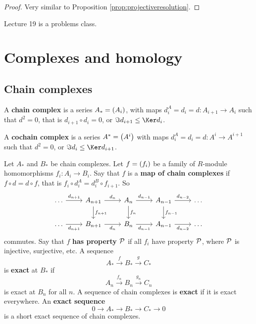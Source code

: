 \begin{proof}
Very similar to Proposition \ref{prop:projectiveresolution}.
\end{proof}


Lecture 19 is a problems class.

\pagebreak

\section{Complexes and homology}

\subsection{Chain complexes}


\begin{definition}
A \textbf{chain complex} is a series $ A_* = \br{A_i} $, with maps $ d_i^A = d_i = d : A_{i + 1} \to A_i $ such that $ d^2 = 0 $, that is $ d_{i + 1} \circ d_i = 0 $, or $ \Im d_{i + 1} \le \Ker d_i $.
\end{definition}

\begin{definition}
A \textbf{cochain complex} is a series $ A^* = \br{A^i} $ with maps $ d_i^A = d_i = d : A^i \to A^{i + 1} $ such that $ d^2 = 0 $, or $ \Im d_i \le \Ker d_{i + 1} $.
\end{definition}

Let $ A_* $ and $ B_* $ be chain complexes. Let $ f = \br{f_i} $ be a family of $ R $-module homomorphisms $ f_i : A_i \to B_i $. Say that $ f $ is a \textbf{map of chain complexes} if $ f \circ d = d \circ f $, that is $ f_i \circ d_i^A = d_i^B \circ f_{i + 1} $. So
$$
\begin{tikzcd}
\dots \arrow{r}{d_{n + 1}} & A_{n + 1} \arrow{r}{d_n} \arrow{d}{f_{n + 1}} & A_n \arrow{r}{d_{n - 1}} \arrow{d}{f_n} & A_{n - 1} \arrow{r}{d_{n - 2}} \arrow{d}{f_{n - 1}} & \dots \\
\dots \arrow[swap]{r}{d_{n + 1}} & B_{n + 1} \arrow[swap]{r}{d_n} & B_n \arrow[swap]{r}{d_{n - 1}} & A_{n - 1} \arrow[swap]{r}{d_{n - 2}} & \dots
\end{tikzcd}
$$
commutes. Say that $ f $ \textbf{has property $ \mathcal{P} $} if all $ f_i $ have property $ \mathcal{P} $, where $ \mathcal{P} $ is injective, surjective, etc. A sequence
$$ A_* \xrightarrow{f} B_* \xrightarrow{g} C_* $$
is \textbf{exact} at $ B_* $ if
$$ A_n \xrightarrow{f_n} B_n \xrightarrow{g_n} C_n $$
is exact at $ B_n $ for all $ n $. A sequence of chain complexes is \textbf{exact} if it is exact everywhere. An \textbf{exact sequence}
$$ 0 \to A_* \to B_* \to C_* \to 0 $$
is a short exact sequence of chain complexes.

